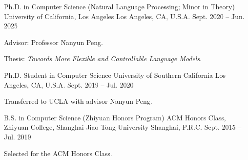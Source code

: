 
\begin{cventries}
  \cventry
    {Ph.D. in Computer Science (Natural Language Processing; Minor in Theory)}
    {University of California, Los Angeles}
    {Los Angeles, CA, U.S.A.}
    {Sept. 2020 -- Jun. 2025}
    {
      \begin{cvitems}
        \item {Advisor: Professor Nanyun Peng.}
        \item {Thesis: \emph{Towards More Flexible and Controllable Language Models}.}
      \end{cvitems}
    }

  \cventry
    {Ph.D. Student in Computer Science}
    {University of Southern California}
    {Los Angeles, CA, U.S.A.}
    {Sept. 2019 -- Jul. 2020}
    {
      \begin{cvitems}
        \item {Transferred to UCLA with advisor Nanyun Peng.}
      \end{cvitems}
    }

  \cventry
    {B.S. in Computer Science (Zhiyuan Honors Program)}
    {ACM Honors Class, Zhiyuan College, Shanghai Jiao Tong University}
    {Shanghai, P.R.C.}
    {Sept. 2015 -- Jul. 2019}
    {
      \begin{cvitems}
        \item {Selected for the ACM Honors Class.}
      \end{cvitems}
    }
\end{cventries}
